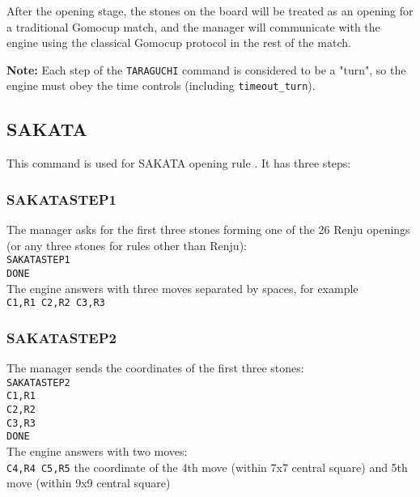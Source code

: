 \documentclass[12pt,a4paper]{article}
\begin{document}
After the opening stage, the stones on the board will be treated as an opening for a traditional Gomocup match, and the manager will communicate with the engine using the classical Gomocup protocol in the rest of the match.

\textbf{Note:} Each step of the \texttt{TARAGUCHI} command is considered to be a "turn", so the engine must obey the time controls (including \texttt{timeout{\_}turn}).


\subsection{SAKATA}
\label{cmd_sakata}
This command is used for SAKATA opening rule \cite{renju_opening_rules}. It has three steps:

\subsubsection{SAKATASTEP1}
The manager asks for the first three stones forming one of the 26 Renju openings (or any three stones for rules other than Renju):\\
\texttt{SAKATASTEP1}\\
\texttt{DONE}\\
The engine answers with three moves separated by spaces, for example\\
\texttt{C1,R1 C2,R2 C3,R3}

\subsubsection{SAKATASTEP2}
The manager sends the coordinates of the first three stones:\\
\texttt{SAKATASTEP2}\\
\texttt{C1,R1}\\
\texttt{C2,R2}\\
\texttt{C3,R3}\\
\texttt{DONE}\\
The engine answers with two moves:\\
\texttt{C4,R4 C5,R5} the coordinate of the 4th move (within 7x7 central square) and 5th move (within 9x9 central square)
\end{document}
